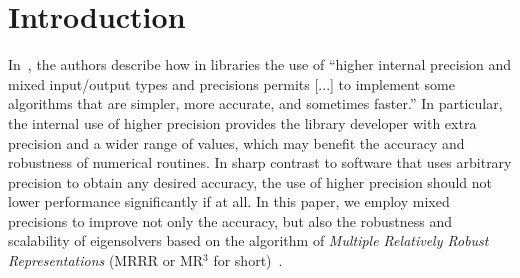 \documentclass[final]{siamltex}
\begin{document}
\pagestyle{myheadings}
\thispagestyle{plain}


\section{Introduction}
\label{sec:intro}

In~\cite{Li02design}, the authors
describe how in libraries the use of ``higher internal
precision and mixed input/output types and precisions permits
[...] to implement some algorithms that are simpler, more accurate, and
sometimes faster.'' In particular, the internal use of higher precision
provides the 
library developer with extra precision and a wider range of values, which may
benefit the accuracy and robustness of numerical routines. 
In sharp contrast to software that uses
arbitrary precision to obtain any desired accuracy, the use of higher precision should not
lower performance  significantly if at all. In this paper, we employ
mixed precisions to improve not only the accuracy, but also the robustness and
scalability of eigensolvers based on the algorithm of {\it Multiple Relatively
  Robust Representations} (MRRR or MR$^3$ for
short)~\cite{DesignMRRR,Bientinesi:2005:PMR3,Vomel:2010:ScaLAPACKsMRRR,mr3smp,EleMRRR,Willems:Diss}.  
\end{document}
